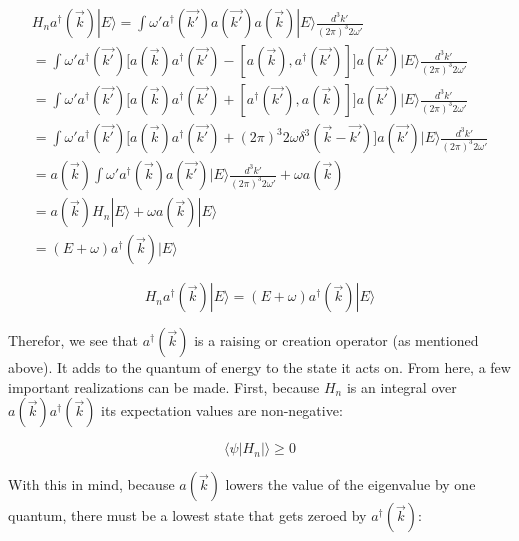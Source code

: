 \documentclass{article}
\begin{document}
    \begin{equation}
        \begin{aligned}
            H_{n} a^{\dag}(\vec{k}) | E \rangle = \int \omega' a^{\dag} (\vec{k'}) a (\vec{k'}) a (\vec{k}) | E \rangle \frac{d^{3} k'}{(2 \pi)^{3} 2 \omega'} \\
            = \int \omega' a^{\dag} (\vec{k'}) \big[a (\vec{k}) a^{\dag} (\vec{k'}) - [a (\vec{k}), a^{\dag} (\vec{k'})] \big] a (\vec{k'}) | E \rangle \frac{d^{3} k'}{(2 \pi)^{3} 2 \omega'} \\
            = \int \omega' a^{\dag} (\vec{k'}) \big[a (\vec{k}) a^{\dag} (\vec{k'}) + [a^{\dag} (\vec{k'}), a (\vec{k})] \big] a (\vec{k'}) | E \rangle \frac{d^{3} k'}{(2 \pi)^{3} 2 \omega'} \\
            = \int \omega' a^{\dag} (\vec{k'}) \big[a (\vec{k}) a^{\dag} (\vec{k'}) + (2 \pi)^3 2 \omega \delta^{3} (\vec{k} - \vec{k'}) \big] a (\vec{k'}) | E \rangle \frac{d^{3} k'}{(2 \pi)^{3} 2 \omega'} \\
            = a (\vec{k}) \int \omega' a^{\dag} (\vec{k}) a (\vec{k'}) | E \rangle \frac{d^{3} k'}{(2 \pi)^{3} 2 \omega'} + \omega a (\vec{k}) \\
            = a (\vec{k}) H_{n} | E \rangle + \omega a (\vec{k}) | E \rangle \\
            = (E + \omega) a^{\dag}(\vec{k}) | E \rangle
        \end{aligned}
    \end{equation}

    \begin{framed}
        \begin{equation}
            H_{n} a^{\dag}(\vec{k}) | E \rangle = (E + \omega) a^{\dag}(\vec{k}) | E \rangle
        \end{equation}
    \end{framed}

    Therefor, we see that $a^{\dag}(\vec{k})$ is a raising or creation operator (as mentioned above). It adds to the quantum of energy to the state
    it acts on. From here, a few important realizations can be made. First, because $H_{n}$ is an integral over $a(\vec{k}) a^{\dag}(\vec{k})$ its
    expectation values are non-negative:

    \begin{equation}
        \langle \psi | H_{n} | \rangle \geq 0
    \end{equation}

    With this in mind, because $a(\vec{k})$ lowers the value of the eigenvalue by one quantum, there must be a lowest state that gets zeroed by 
    $a^{\dag}(\vec{k})$:
\end{document}
